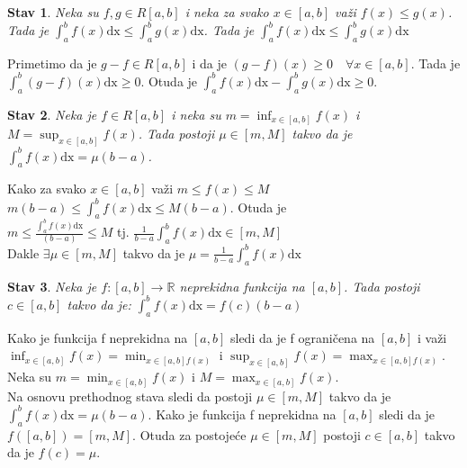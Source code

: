 \documentclass{article}
\newtheorem{stav}{Stav}[section]
\begin{document}
\begin{stavbox}
    \begin{stav}
        Neka su $f, g \in R[a,b]$ i neka za svako $x \in [a, b]$ važi $f(x) \leq g(x)$. Tada je $\displaystyle \int^b_a f(x) \text{dx} \leq \int^b_a g(x)\text{dx}$. Tada je $\displaystyle \int^b_a f(x)\text{dx} \leq \int^b_a g(x)\text{dx}$
    \end{stav}
\end{stavbox}
Primetimo da je $g-f \in R[a, b]$ i da je $(g-f)(x) \geq 0\quad\forall x\in[a,b]$. Tada je $\displaystyle \int^b_a (g-f)(x)\text{dx} \geq 0$. Otuda je $\displaystyle \int^b_a f(x)\text{dx} - \int^b_a g(x)\text{dx} \geq 0$.
\begin{stavbox}
    \begin{stav}
        Neka je $f \in R[a, b]$ i neka su $\displaystyle m = \inf_{x\in [a, b]} f(x)$ i $\displaystyle M = \sup_{x \in [a,b]} f(x)$. Tada postoji $\mu \in [m, M]$ takvo da je $\displaystyle \int^b_a f(x) \text{dx} = \mu(b-a)$.
    \end{stav}
\end{stavbox}
Kako za svako $x \in [a, b]$ važi $m \leq f(x) \leq M$\\
$m(b-a) \leq \displaystyle\int^b_a f(x)\text{dx} \leq M(b-a)$. Otuda je\\
$m \leq \displaystyle \frac{\int^b_a f(x)\text{dx}}{(b-a)} \leq M$ tj. $\displaystyle \frac{1}{b-a}\int^b_a f(x)\text{dx} \in [m, M]$\\
Dakle $\exists\mu\in[m, M]$ takvo da je $\displaystyle \mu=\frac{1}{b-a}\int^b_a f(x)\text{dx}$
\begin{stavbox}
    \begin{stav}
        Neka je $f: [a, b] \longrightarrow \mathbb{R}$ neprekidna funkcija na $[a, b]$. Tada postoji $c\in [a,b]$ takvo da je: $\displaystyle \int^b_a f(x)\text{dx} = f(c)(b-a)$
    \end{stav}
\end{stavbox}
Kako je funkcija f neprekidna na $[a, b]$ sledi da je f ograničena na $[a, b]$ i važi $\displaystyle \inf_{x\in[a,b]} f(x) = \min_{x \in [a, b] f(x)}$ i $\displaystyle \sup_{x\in[a,b]} f(x) = \max_{x \in [a, b] f(x)}$. Neka su $\displaystyle m = \min_{x\in[a,b]} f(x)$ i  $\displaystyle M = \max_{x\in[a,b]} f(x)$.\\
Na osnovu prethodnog stava sledi da postoji $\mu \in [m, M]$ takvo da je $\displaystyle \int^b_a f(x) \text{dx} = \mu (b-a)$. Kako je funkcija f neprekidna na $[a, b]$ sledi da je $f([a,b]) = [m, M]$. Otuda za postojeće $\mu \in [m, M]$ postoji $c \in [a, b]$ takvo da je $f(c) = \mu$.
\end{document}
